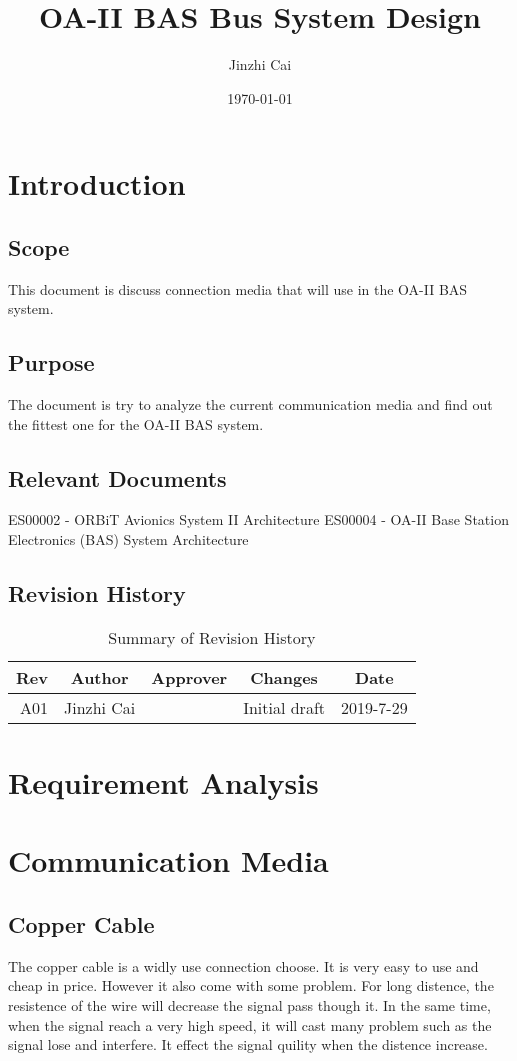 \documentclass[12pt,article]{memoir}
\title{OA-II BAS Bus System Design}
\author{Jinzhi Cai}
\date{\today}
\begin{document}
	


\tableofcontents*
\clearpage


\chapter{Introduction}
\section{Scope}
This document is discuss connection media that will use in the OA-II BAS system.
\section{Purpose}
The document is try to analyze the current communication media and find out the fittest one for the OA-II BAS system.
\section{Relevant Documents}
ES00002 - ORBiT Avionics System II Architecture
ES00004 - OA-II Base Station Electronics (BAS) System Architecture
\section{Revision History}
\begin{table}[H]
	\centering
	\begin{tabu}{r || c | c | c | c }
		Rev & Author & Approver & Changes & Date\\ \hline
		A01 & Jinzhi Cai & & Initial draft & 2019-7-29 \\
	\end{tabu}
	\caption{Summary of Revision History}
	\label{tab:rev}
\end{table}
\newpage
\chapter{Requirement Analysis}
\newpage
\chapter{Communication Media}
\section{Copper Cable}
The copper cable is a widly use connection choose. It is very easy to use and cheap in price. However it also come with some problem. For long distence, the resistence of the wire will decrease the signal pass though it. In the same time, when the signal reach a very high speed, it will cast many problem such as the signal lose and interfere. It effect the signal quility when the distence increase.
\end{document}
